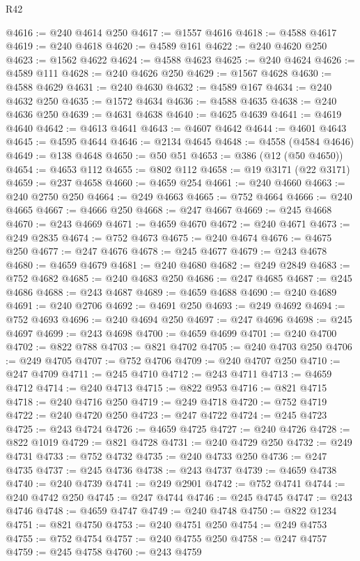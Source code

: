 \begin{lexlean}{R42}
\begin{coremodule}
{@4616 := @240 @4614 @250
@4617 := @1557 @4616
@4618 := @4588 @4617
@4619 := @240 @4618
@4620 := @4589 @161
@4622 := @240 @4620 @250
@4623 := @1562 @4622
@4624 := @4588 @4623
@4625 := @240 @4624
@4626 := @4589 @111
@4628 := @240 @4626 @250
@4629 := @1567 @4628
@4630 := @4588 @4629
@4631 := @240 @4630
@4632 := @4589 @167
@4634 := @240 @4632 @250
@4635 := @1572 @4634
@4636 := @4588 @4635
@4638 := @240 @4636 @250
@4639 := @4631 @4638
@4640 := @4625 @4639
@4641 := @4619 @4640
@4642 := @4613 @4641
@4643 := @4607 @4642
@4644 := @4601 @4643
@4645 := @4595 @4644
@4646 := @2134 @4645
@4648 := @4558 (@4584 @4646)
@4649 := @138 @4648
@4650 := @50 @51
@4653 := @386 (@12 (@50 @4650))
@4654 := @4653 @112
@4655 := @802 @112
@4658 := @19 @3171 (@22 @3171)
@4659 := @237 @4658
@4660 := @4659 @254
@4661 := @240 @4660
@4663 := @240 @2750 @250
@4664 := @249 @4663
@4665 := @752 @4664
@4666 := @240 @4665
@4667 := @4666 @250
@4668 := @247 @4667
@4669 := @245 @4668
@4670 := @243 @4669
@4671 := @4659 @4670
@4672 := @240 @4671
@4673 := @249 @2835
@4674 := @752 @4673
@4675 := @240 @4674
@4676 := @4675 @250
@4677 := @247 @4676
@4678 := @245 @4677
@4679 := @243 @4678
@4680 := @4659 @4679
@4681 := @240 @4680
@4682 := @249 @2849
@4683 := @752 @4682
@4685 := @240 @4683 @250
@4686 := @247 @4685
@4687 := @245 @4686
@4688 := @243 @4687
@4689 := @4659 @4688
@4690 := @240 @4689
@4691 := @240 @2706
@4692 := @4691 @250
@4693 := @249 @4692
@4694 := @752 @4693
@4696 := @240 @4694 @250
@4697 := @247 @4696
@4698 := @245 @4697
@4699 := @243 @4698
@4700 := @4659 @4699
@4701 := @240 @4700
@4702 := @822 @788
@4703 := @821 @4702
@4705 := @240 @4703 @250
@4706 := @249 @4705
@4707 := @752 @4706
@4709 := @240 @4707 @250
@4710 := @247 @4709
@4711 := @245 @4710
@4712 := @243 @4711
@4713 := @4659 @4712
@4714 := @240 @4713
@4715 := @822 @953
@4716 := @821 @4715
@4718 := @240 @4716 @250
@4719 := @249 @4718
@4720 := @752 @4719
@4722 := @240 @4720 @250
@4723 := @247 @4722
@4724 := @245 @4723
@4725 := @243 @4724
@4726 := @4659 @4725
@4727 := @240 @4726
@4728 := @822 @1019
@4729 := @821 @4728
@4731 := @240 @4729 @250
@4732 := @249 @4731
@4733 := @752 @4732
@4735 := @240 @4733 @250
@4736 := @247 @4735
@4737 := @245 @4736
@4738 := @243 @4737
@4739 := @4659 @4738
@4740 := @240 @4739
@4741 := @249 @2901
@4742 := @752 @4741
@4744 := @240 @4742 @250
@4745 := @247 @4744
@4746 := @245 @4745
@4747 := @243 @4746
@4748 := @4659 @4747
@4749 := @240 @4748
@4750 := @822 @1234
@4751 := @821 @4750
@4753 := @240 @4751 @250
@4754 := @249 @4753
@4755 := @752 @4754
@4757 := @240 @4755 @250
@4758 := @247 @4757
@4759 := @245 @4758
@4760 := @243 @4759
}
\end{coremodule}
\end{lexlean}
